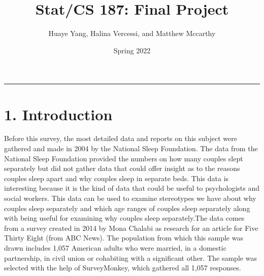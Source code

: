 \documentclass[
]{article}
\title{Stat/CS 187: Final Project}
\author{Huaye Yang, Halina Vercessi, and Matthew Mccarthy}
\date{Spring 2022}
\newenvironment{Shaded}{\begin{snugshade}}{\end{snugshade}}
\newcommand{\AttributeTok}[1]{\textcolor[rgb]{0.77,0.63,0.00}{#1}}
\newcommand{\CommentTok}[1]{\textcolor[rgb]{0.56,0.35,0.01}{\textit{#1}}}
\newcommand{\ConstantTok}[1]{\textcolor[rgb]{0.00,0.00,0.00}{#1}}
\newcommand{\DecValTok}[1]{\textcolor[rgb]{0.00,0.00,0.81}{#1}}
\newcommand{\FunctionTok}[1]{\textcolor[rgb]{0.00,0.00,0.00}{#1}}
\newcommand{\NormalTok}[1]{#1}
\newcommand{\SpecialCharTok}[1]{\textcolor[rgb]{0.00,0.00,0.00}{#1}}
\begin{document}
\maketitle

{
\setcounter{tocdepth}{2}
\tableofcontents
}
\begin{Shaded}
\end{Shaded}

\begin{center}\rule{0.5\linewidth}{0.5pt}\end{center}

\hypertarget{introduction}{%
\section{1. Introduction}\label{introduction}}

Before this survey, the most detailed data and reports on this subject
were gathered and made in 2004 by the National Sleep Foundation. The
data from the National Sleep Foundation provided the numbers on how many
couples slept separately but did not gather data that could offer
insight as to the reasons couples sleep apart and why couples sleep in
separate beds. This data is interesting because it is the kind of data
that could be useful to psychologists and social workers. This data can
be used to examine stereotypes we have about why couples sleep
separately and which age ranges of couples sleep separately along with
being useful for examining why couples sleep separately.The data comes
from a survey created in 2014 by Mona Chalabi as research for an article
for Five Thirty Eight (from ABC News). The population from which this
sample was drawn includes 1,057 American adults who were married, in a
domestic partnership, in civil union or cohabiting with a significant
other. The sample was selected with the help of SurveyMonkey, which
gathered all 1,057 responses.
\end{document}
